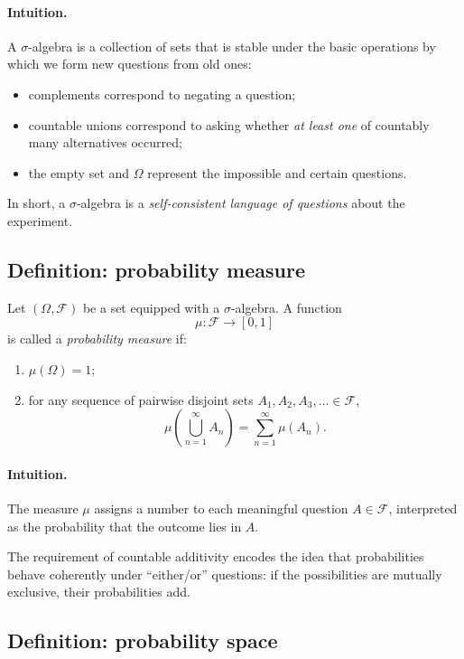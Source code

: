 \documentclass[11pt]{article}
\theoremstyle{remark}
\begin{document}
\paragraph{Intuition.}
A \(\sigma\)-algebra is a collection of sets that is stable under the basic
operations by which we form new questions from old ones:
\begin{itemize}
\item complements correspond to negating a question;
\item countable unions correspond to asking whether \emph{at least one} of
countably many alternatives occurred;
\item the empty set and \(\Omega\) represent the impossible and certain questions.
\end{itemize}

In short, a \(\sigma\)-algebra is a \emph{self-consistent language of questions}
about the experiment.

\medskip

\subsection{Definition: probability measure}

Let \((\Omega,\mathcal{F})\) be a set equipped with a \(\sigma\)-algebra.
A function
\[
\mu : \mathcal{F} \to [0,1]
\]
is called a \emph{probability measure} if:
\begin{enumerate}
\item \(\mu(\Omega) = 1\);
\item for any sequence of pairwise disjoint sets \(A_1, A_2, A_3, \dots \in \mathcal{F}\),
\[
\mu\!\left(\bigcup_{n=1}^{\infty} A_n\right)
=
\sum_{n=1}^{\infty} \mu(A_n).
\]
\end{enumerate}

\paragraph{Intuition.}
The measure \(\mu\) assigns a number to each meaningful question \(A \in \mathcal{F}\),
interpreted as the probability that the outcome lies in \(A\).

The requirement of countable additivity encodes the idea that probabilities behave
coherently under ``either/or'' questions:
if the possibilities are mutually exclusive, their probabilities add.

\medskip

\subsection{Definition: probability space}
\end{document}
